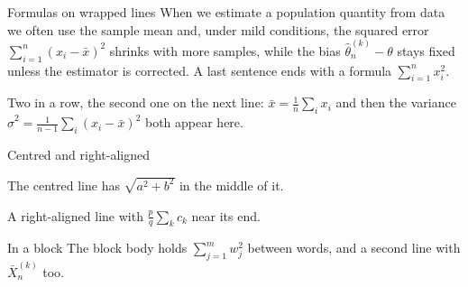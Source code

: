 \documentclass{beamer}
\begin{document}
\begin{frame}{Formulas on wrapped lines}
  When we estimate a population quantity from data we often use the sample mean and,
  under mild conditions, the squared error $\sum_{i=1}^{n} (x_i - \bar x)^2$ shrinks with more samples,
  while the bias $\hat{\theta}_n^{(k)} - \theta$ stays fixed unless the estimator is corrected.
  A last sentence ends with a formula $\sum_{i=1}^{n} x_i^2$.

  \medskip
  Two in a row, the second one on the next line: $\bar x = \frac{1}{n}\sum_i x_i$ and then
  the variance $\hat\sigma^2 = \frac{1}{n-1}\sum_i (x_i - \bar x)^2$ both appear here.
\end{frame}

\begin{frame}{Centred and right-aligned}
  \begin{center}
    The centred line has $\sqrt{a^2 + b^2}$ in the middle of it.
  \end{center}
  \begin{flushright}
    A right-aligned line with $\frac{p}{q}\sum_k c_k$ near its end.
  \end{flushright}
  \begin{block}{In a block}
    The block body holds $\sum_{j=1}^{m} w_j^2$ between words, and a second line
    with $\bar{X}_n^{(k)}$ too.
  \end{block}
\end{frame}
\end{document}
